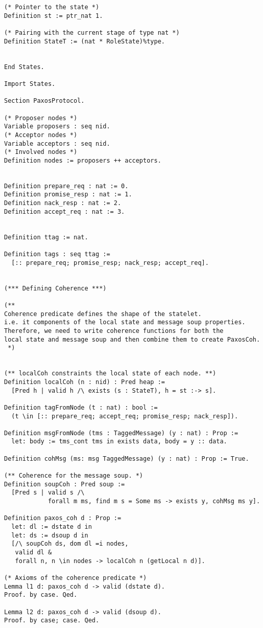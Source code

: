 \begin{landscape}
\begin{multicols*}{2}
\begin{lstlisting}[style=SourceCodeListing]
(* Pointer to the state *)
Definition st := ptr_nat 1.

(* Pairing with the current stage of type nat *)
Definition StateT := (nat * RoleState)%type.


End States.

Import States.

Section PaxosProtocol.

(* Proposer nodes *)
Variable proposers : seq nid.
(* Acceptor nodes *)
Variable acceptors : seq nid.
(* Involved nodes *)
Definition nodes := proposers ++ acceptors.


Definition prepare_req : nat := 0.
Definition promise_resp : nat := 1.
Definition nack_resp : nat := 2.
Definition accept_req : nat := 3.


Definition ttag := nat.

Definition tags : seq ttag :=
  [:: prepare_req; promise_resp; nack_resp; accept_req].


(*** Defining Coherence ***)

(**
Coherence predicate defines the shape of the statelet.
i.e. it components of the local state and message soup properties.
Therefore, we need to write coherence functions for both the
local state and message soup and then combine them to create PaxosCoh.
 *)


(** localCoh constraints the local state of each node. **)
Definition localCoh (n : nid) : Pred heap :=
  [Pred h | valid h /\ exists (s : StateT), h = st :-> s].

Definition tagFromNode (t : nat) : bool :=
  (t \in [:: prepare_req; accept_req; promise_resp; nack_resp]).

Definition msgFromNode (tms : TaggedMessage) (y : nat) : Prop :=
  let: body := tms_cont tms in exists data, body = y :: data.

Definition cohMsg (ms: msg TaggedMessage) (y : nat) : Prop := True.

(** Coherence for the message soup. *)
Definition soupCoh : Pred soup :=
  [Pred s | valid s /\
            forall m ms, find m s = Some ms -> exists y, cohMsg ms y].

Definition paxos_coh d : Prop :=
  let: dl := dstate d in
  let: ds := dsoup d in
  [/\ soupCoh ds, dom dl =i nodes,
   valid dl &
   forall n, n \in nodes -> localCoh n (getLocal n d)].

(* Axioms of the coherence predicate *)
Lemma l1 d: paxos_coh d -> valid (dstate d).
Proof. by case. Qed.

Lemma l2 d: paxos_coh d -> valid (dsoup d).
Proof. by case; case. Qed.


\end{lstlisting}
\end{multicols*}
\end{landscape}
